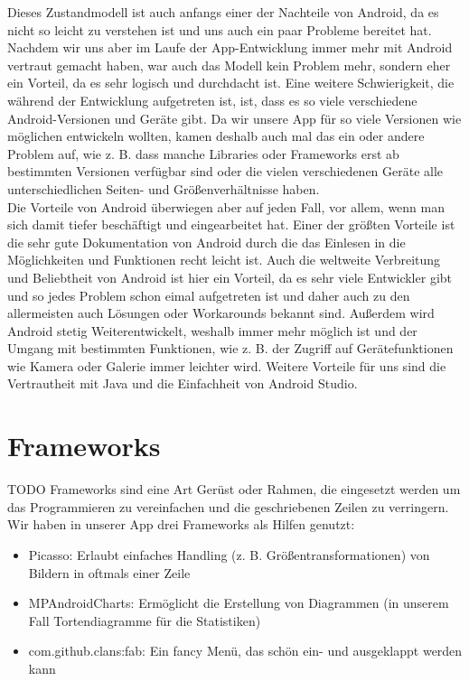 Dieses Zustandmodell ist auch anfangs einer der Nachteile von Android, da es nicht so leicht zu verstehen ist und uns auch ein paar Probleme bereitet hat. Nachdem wir uns aber im Laufe der App-Entwicklung immer mehr mit Android vertraut gemacht haben, war auch das Modell kein Problem mehr, sondern eher ein Vorteil, da es sehr logisch und durchdacht ist. Eine weitere Schwierigkeit, die während der Entwicklung aufgetreten ist, ist, dass es so viele verschiedene Android-Versionen und Geräte gibt. Da wir unsere App für so viele Versionen wie möglichen entwickeln wollten, kamen deshalb auch mal das ein oder andere Problem auf, wie z. B. dass manche Libraries oder Frameworks erst ab bestimmten Versionen verfügbar sind oder die vielen verschiedenen Geräte alle unterschiedlichen Seiten- und Größenverhältnisse haben.\\
Die Vorteile von Android überwiegen aber auf jeden Fall, vor allem, wenn man sich damit tiefer beschäftigt und eingearbeitet hat. Einer der größten Vorteile ist die sehr gute Dokumentation von Android durch die das Einlesen in die Möglichkeiten und Funktionen recht leicht ist. Auch die weltweite Verbreitung und Beliebtheit von Android ist hier ein Vorteil, da es sehr viele Entwickler gibt und so jedes Problem schon eimal aufgetreten ist und daher auch zu den allermeisten auch Lösungen oder Workarounds bekannt sind.
Außerdem wird Android stetig Weiterentwickelt, weshalb immer mehr möglich ist und der Umgang mit bestimmten Funktionen, wie z. B. der Zugriff auf Gerätefunktionen wie Kamera oder Galerie immer leichter wird.
Weitere Vorteile für uns sind die Vertrautheit mit Java und die Einfachheit von Android Studio.

\section{Frameworks}
\label{sec:grundlagen:frameworks}
TODO
Frameworks sind eine Art Gerüst oder Rahmen, die eingesetzt werden um das Programmieren zu vereinfachen und die geschriebenen Zeilen zu verringern.\\
Wir haben in unserer App drei Frameworks als Hilfen genutzt:
\begin{itemize}
\item Picasso: Erlaubt einfaches Handling (z. B. Größentransformationen) von Bildern in oftmals einer Zeile
\item MPAndroidCharts: Ermöglicht die Erstellung von Diagrammen (in unserem Fall Tortendiagramme für die Statistiken)
\item com.github.clans:fab: Ein fancy Menü, das schön ein- und ausgeklappt werden kann
\end{itemize}



















